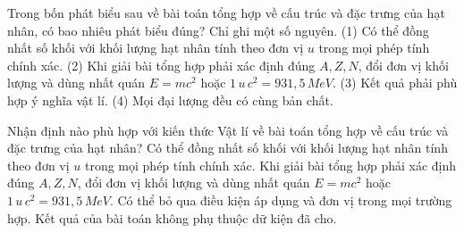\begin{ex}
Trong bốn phát biểu sau về bài toán tổng hợp về cấu trúc và đặc trưng của hạt nhân, có bao nhiêu phát biểu đúng? Chỉ ghi một số nguyên. (1) Có thể đồng nhất số khối với khối lượng hạt nhân tính theo đơn vị $u$ trong mọi phép tính chính xác. (2) Khi giải bài tổng hợp phải xác định đúng $A,Z,N$, đổi đơn vị khối lượng và dùng nhất quán $E=mc^2$ hoặc $1\,u\,c^2=931,5\,MeV$. (3) Kết quả phải phù hợp ý nghĩa vật lí. (4) Mọi đại lượng đều có cùng bản chất.
\end{ex}

\begin{ex}
Nhận định nào phù hợp với kiến thức Vật lí về bài toán tổng hợp về cấu trúc và đặc trưng của hạt nhân?
\choice
{Có thể đồng nhất số khối với khối lượng hạt nhân tính theo đơn vị $u$ trong mọi phép tính chính xác.}
{\True Khi giải bài tổng hợp phải xác định đúng $A,Z,N$, đổi đơn vị khối lượng và dùng nhất quán $E=mc^2$ hoặc $1\,u\,c^2=931,5\,MeV$.}
{Có thể bỏ qua điều kiện áp dụng và đơn vị trong mọi trường hợp.}
{Kết quả của bài toán không phụ thuộc dữ kiện đã cho.}
\end{ex}

